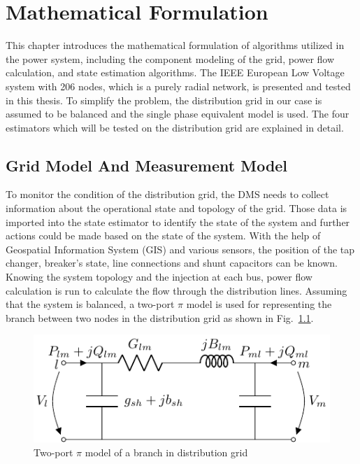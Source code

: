 \chapter{Mathematical Formulation}\label{chap:Math_for}
This chapter introduces the mathematical formulation of algorithms utilized in the power system, including the component modeling of the grid, power flow calculation, and state estimation algorithms. The IEEE European Low Voltage system with 206 nodes, which is a purely radial network, is presented and tested in this thesis. To simplify the problem, the distribution grid in our case is assumed to be balanced and the single phase equivalent model is used. The four estimators which will be tested on the distribution grid are explained in detail.

\section{Grid Model And Measurement Model }\label{subsec:power_flow}
To monitor the condition of the distribution grid, the DMS needs to collect information about the operational state and topology of the grid. Those data is imported into the state estimator to identify the state of the system and further actions could be made based on the state of the system. With the help of Geospatial Information System (GIS) and various sensors, the position of the tap changer, breaker's state, line connections and shunt capacitors can be known. Knowing the system topology and the injection at each bus, power flow calculation is run to calculate the flow through the distribution lines. Assuming that the system is balanced, a two-port $\pi$ model is used for representing the branch between two nodes in the distribution grid as shown in Fig.~\ref{fig:Line_model}.
    \begin{figure}[!h]
        \centering
        \includegraphics{figures/Line_model.pdf}
            \caption{Two-port $\pi$ model of a branch in distribution grid \cite{gomez2004power}}
        \label{fig:Line_model}
    \end{figure}
\bigskip

